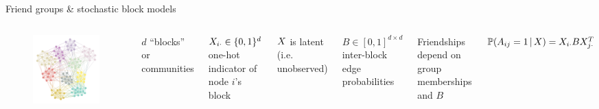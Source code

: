\documentclass{beamer}
\theoremstyle{remark}
\begin{document}
\begin{frame}{Friend groups \& stochastic block models}

    \begin{columns}

        \begin{figure}
            \includegraphics[width=\textwidth]{figures/assortative.png}
        \end{figure}


        $d$ ``blocks'' or communities

        $X_{i \cdot} \in \{0, 1\}^d$ one-hot indicator of node $i$'s block

        \vspace{4mm}

        $X$ is latent (i.e. unobserved)

        \vspace{4mm}

        $B \in [0, 1]^{d \times d}$ inter-block edge probabilities

        \vspace{4mm}

        Friendships depend on group memberships and $B$

        $\P[\X]{A_{ij} = 1} = \X_{i \cdot} B \X_{j \cdot}^T$

    \end{columns}

\end{frame}
\end{document}
